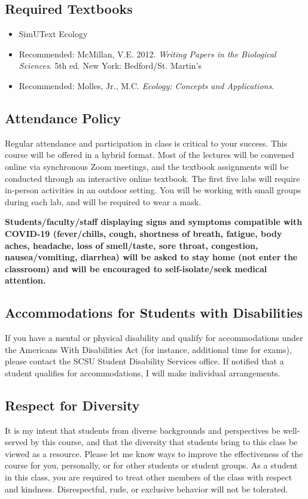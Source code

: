 \documentclass{tufte-handout}
\begin{document}
\begin{fullwidth}
\subsection{Required Textbooks}

\begin{itemize}
	\item SimUText Ecology
	\item Recommended: McMillan, V.E. 2012. \emph{Writing Papers in the Biological Sciences}. 5th ed. New York: Bedford/St. Martin's
	\item Recommended: Molles, Jr., M.C. \emph{Ecology: Concepts and Applications}.
\end{itemize}

\subsection{Attendance Policy}

Regular attendance and participation in class is critical to your success. This course will be offered in a hybrid format. Most of the lectures will be convened online via synchronous Zoom meetings, and the textbook assignments will be conducted through an interactive online textbook. The first five labs will require in-person activities in an outdoor setting. You will be working with small groups during each lab, and will be required to wear a mask. 

\textbf{Students/faculty/staff displaying signs and symptoms compatible with COVID-19 (fever/chills, cough, shortness of breath, fatigue, body aches, headache, loss of smell/taste, sore throat, congestion,  nausea/vomiting, diarrhea) will be asked to stay home (not enter the classroom) and will be encouraged to self-isolate/seek medical attention.}



\subsection{Accommodations for Students with Disabilities}

If you have a mental or physical disability and qualify for accommodations under the Americans With Disabilities Act (for instance, additional time for exams), please contact the SCSU Student Disability Services office. If notified that a student qualifies for accommodations, I will make individual arrangements.

\subsection{Respect for Diversity}

It is my intent that students from diverse backgrounds and perspectives be well-served by this course, and that the diversity that students bring to this class be viewed as a resource. Please let me know ways to improve the effectiveness of the course for you, personally, or for other students or student groups. As a student in this class, you are required to treat other members of the class with respect and kindness. Disrespectful, rude, or exclusive behavior will not be tolerated.

\end{fullwidth}
\end{document}
